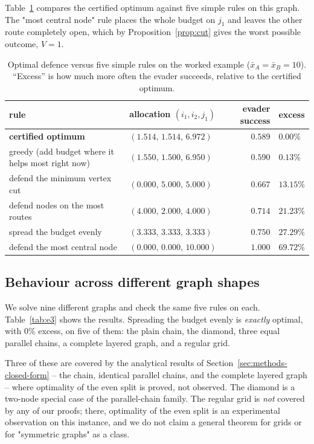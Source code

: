 \documentclass[11pt,a4paper]{article}
\theoremstyle{plain}
\theoremstyle{definition}
\newcommand{\XA}{\bar{x}_A}
\newcommand{\XB}{\bar{x}_B}
\begin{document}
Table~\ref{tab:e2} compares the certified optimum against five simple
rules on this graph. The "most central node" rule places the whole
budget on $j_1$ and leaves the other route completely open, which by
Proposition~\ref{prop:cut} gives the worst possible outcome, $V=1$.

\begin{table}[htbp]
\centering
\caption{Optimal defence versus five simple rules on the worked example
($\XA=\XB=10$). ``Excess'' is how much more often the evader succeeds,
relative to the certified optimum.}
\label{tab:e2}
\small
\begin{tabular}{llrl}
\toprule
rule & allocation $(i_1,i_2,j_1)$ & evader success & excess\\
\midrule
\textbf{certified optimum} & $(1.514,\,1.514,\,6.972)$ & $0.589$ & $0.00\%$\\
greedy (add budget where it helps most right now) & $(1.550,\,1.500,\,6.950)$ & $0.590$ & $0.13\%$\\
defend the minimum vertex cut & $(0.000,\,5.000,\,5.000)$ & $0.667$ & $13.15\%$\\
defend nodes on the most routes & $(4.000,\,2.000,\,4.000)$ & $0.714$ & $21.23\%$\\
spread the budget evenly & $(3.333,\,3.333,\,3.333)$ & $0.750$ & $27.29\%$\\
defend the most central node & $(0.000,\,0.000,\,10.000)$ & $1.000$ & $69.72\%$\\
\bottomrule
\end{tabular}
\end{table}

\subsection{Behaviour across different graph shapes}
\label{sec:results-topologies}

We solve nine different graphs and check the same five rules on each.
Table~\ref{tab:e3} shows the results. Spreading the budget evenly is
\emph{exactly} optimal, with $0\%$ excess, on five of them: the plain
chain, the diamond, three equal parallel chains, a complete layered
graph, and a regular grid.

Three of these are covered by the analytical results of
Section~\ref{sec:methods-closed-form} -- the chain, identical parallel
chains, and the complete layered graph -- where optimality of the even
split is proved, not observed. The diamond is a two-node special case of
the parallel-chain family. The regular grid is \emph{not} covered by any
of our proofs; there, optimality of the even split is an experimental
observation on this instance, and we do not claim a general theorem for
grids or for "symmetric graphs" as a class.
\end{document}
